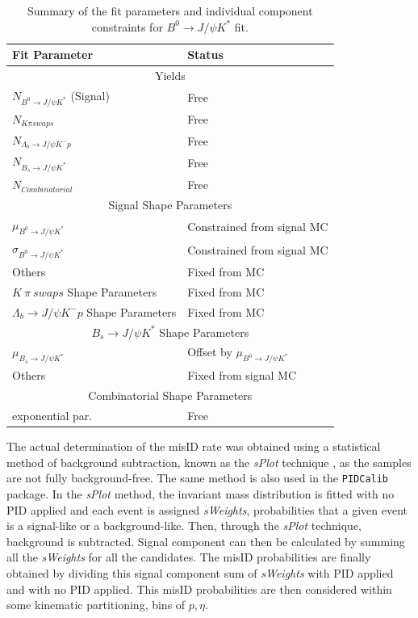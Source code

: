 \begin{table}[H]
\centering
\begin{tabular}{ l  l }\toprule
Fit Parameter & Status  \\ \hline
	\multicolumn{2}{c}{Yields} \\ \hline
$N_{B^{0} \rightarrow J/\psi K^{*}}$ (Signal)  &  Free \\
$N_{K \pi swaps}$ & Free\\
$N_{\Lambda_{b} \rightarrow J/\psi K^{-} p}$ & Free\\
$N_{B_{s} \rightarrow J/\psi K^{*}}$ & Free \\
$N_{Combinatorial}$ & Free\\
\hline
	\multicolumn{2}{c}{Signal Shape Parameters} \\
\hline
$\mu_{B^{0} \rightarrow J/\psi K^{*}}$ & Constrained from signal MC\\
$\sigma_{B^{0} \rightarrow J/\psi K^{*}}$ & Constrained from signal MC\\
Others & Fixed from MC\\
\hline
$K\ \pi\ swaps$ Shape Parameters & Fixed from MC \\
\hline
$\Lambda_{b} \rightarrow J/\psi K^{-} p$ Shape Parameters & Fixed from MC \\
\hline
	\multicolumn{2}{c}{${B_{s} \rightarrow J/\psi K^{*}}$ Shape Parameters} \\\hline
$\mu_{B_{s} \rightarrow J/\psi K^{*}}$ & Offset by $\mu_{B^{0} \rightarrow J/\psi K^{*}}$ \\
Others & Fixed from signal MC \\
\hline
	\multicolumn{2}{c}{Combinatorial Shape Parameters}  \\
\hline
exponential par.  & Free\\
\bottomrule
\end{tabular}
\caption{Summary of the fit parameters and individual component constraints for $B^{0} \rightarrow J/\psi K^{*}$ fit.}
\label{tab:floatingparsummarylol}
\end{table}






The actual determination of the misID rate was obtained using a statistical method of background subtraction, known as the \textit{sPlot} technique \cite{sPlot}, as the samples are not fully background-free. The same method is also used in the \texttt{PIDCalib} package. In the \textit{sPlot} method, the invariant mass distribution is fitted with no \gls{PID} applied and each event is assigned \textit{sWeights}, probabilities that a given event is a signal-like or a background-like. Then, through the \textit{sPlot} technique, background is subtracted. Signal component can then be calculated by summing all the \textit{sWeights} for all the candidates. The misID probabilities are finally obtained by dividing this signal component sum of \textit{sWeights} with \gls{PID} applied and with no \gls{PID} applied. This misID probabilities are then considered within some kinematic partitioning, bins of $p,\eta$. 

